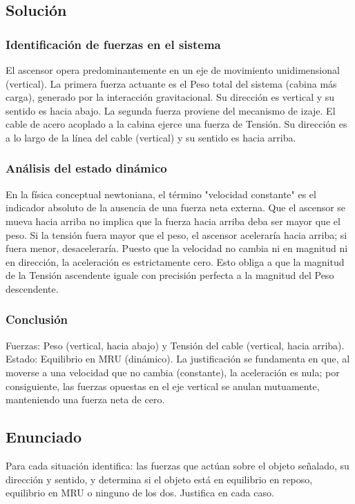 \documentclass[12pt, a4paper]{article}
\begin{document}
\subsection*{Solución}

\subsubsection*{Identificación de fuerzas en el sistema}
El ascensor opera predominantemente en un eje de movimiento unidimensional (vertical).
La primera fuerza actuante es el Peso total del sistema (cabina más carga), generado por la interacción gravitacional. Su dirección es vertical y su sentido es hacia abajo.
La segunda fuerza proviene del mecanismo de izaje. El cable de acero acoplado a la cabina ejerce una fuerza de Tensión. Su dirección es a lo largo de la línea del cable (vertical) y su sentido es hacia arriba.

\subsubsection*{Análisis del estado dinámico}
En la física conceptual newtoniana, el término "velocidad constante" es el indicador absoluto de la ausencia de una fuerza neta externa. Que el ascensor se mueva hacia arriba no implica que la fuerza hacia arriba deba ser mayor que el peso. Si la tensión fuera mayor que el peso, el ascensor aceleraría hacia arriba; si fuera menor, desaceleraría. Puesto que la velocidad no cambia ni en magnitud ni en dirección, la aceleración es estrictamente cero. Esto obliga a que la magnitud de la Tensión ascendente iguale con precisión perfecta a la magnitud del Peso descendente.

\subsubsection*{Conclusión}
Fuerzas: Peso (vertical, hacia abajo) y Tensión del cable (vertical, hacia arriba).
Estado: Equilibrio en MRU (dinámico). La justificación se fundamenta en que, al moverse a una velocidad que no cambia (constante), la aceleración es nula; por consiguiente, las fuerzas opuestas en el eje vertical se anulan mutuamente, manteniendo una fuerza neta de cero.

\newpage
\subsection*{Enunciado}
Para cada situación identifica: las fuerzas que actúan sobre el objeto señalado, su dirección y sentido, y determina si el objeto está en equilibrio en reposo, equilibrio en MRU o ninguno de los dos. Justifica en cada caso.
\end{document}
